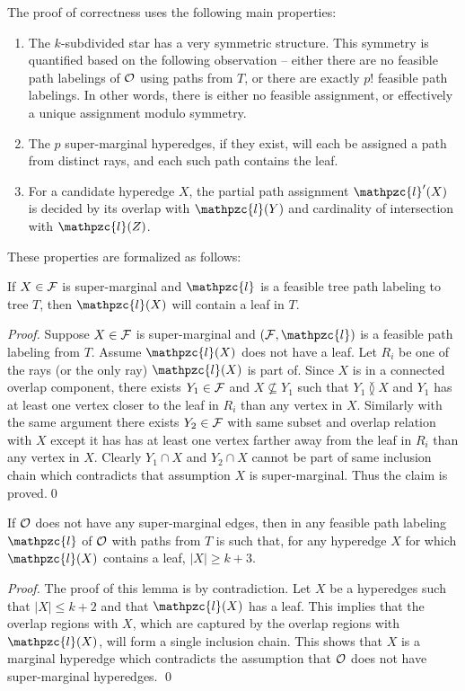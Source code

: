 \documentclass[11pt,
               envcountsect,
               envcountsame]
               {../lib/llncs2e/llncs}
\def\cF{{\cal F}}
\def\cO{{\cal O}}
\def\cl{\mathpzc{l}}
\def\overlap{\between}
\begin{document}
\noindent
The proof of correctness uses the following main properties:
\begin{enumerate}
\item The $k$-subdivided star has a very symmetric structure.  This
  symmetry is quantified based on the following observation -- either
  there are no feasible path labelings of $\cO$ using paths from $T$,
  or there are exactly $p!$ feasible path labelings.  In other words,
  there is either no feasible assignment, or effectively a unique
  assignment modulo symmetry.
\item The $p$ super-marginal hyperedges, if they exist, will each be
  assigned a path from distinct rays, and each such path contains the
  leaf.
\item For a candidate hyperedge $X$, the partial path assignment
  $\cl'(X)$ is decided by its overlap with $\cl(Y)$ and cardinality of
  intersection with $\cl(Z)$.
\end{enumerate}
These properties are formalized as follows:
\begin{lemma}
  \label{lem:sup-mar}
  If $X \in \cF$ is super-marginal and $\cl$ is a feasible tree path
  labeling to tree $T$, then $\cl(X)$ will contain a leaf in $T$.
\end{lemma}
\begin{proof}
  Suppose $X \in \cF$ is super-marginal and $(\cF, \cl)$ is a feasible
  path labeling from $T$.  Assume $\cl(X)$ does not have a leaf.  Let
  $R_i$ be one of the rays (or the only ray) $\cl(X)$ is part of.
  Since $X$ is in a connected overlap component, there exists $Y_1 \in
  \cF$ and $X \nsubseteq Y_1$ such that $Y_1 \overlap X$ and $Y_1$ has
  at least one vertex closer to the leaf in $R_i$ than any vertex in
  $X$. Similarly with the same argument there exists $Y_2 \in \cF$
  with same subset and overlap relation with $X$ except it has has at
  least one vertex farther away from the leaf in $R_i$ than any vertex
  in $X$. Clearly $Y_1 \cap X$ and $Y_2 \cap X$ cannot be part of same
  inclusion chain which contradicts that assumption $X$ is
  super-marginal. Thus the claim is proved.\qed
\end{proof}
\begin{lemma}
  If $\cO$ does not have any super-marginal edges, then in any
  feasible path labeling $\cl$ of $\cO$ with paths from $T$ is such
  that, for any hyperedge $X$ for which $\cl(X)$ contains a leaf, $|X|
  \geq k+3$.
\end{lemma}
\begin{proof}
  The proof of this lemma is by contradiction.  Let $X$ be a
  hyperedges such that $|X| \leq k+2$ and that $\cl(X)$ has a leaf.
  This implies that the overlap regions with $X$, which are captured by
  the overlap regions with $\cl(X)$, will form a single inclusion
  chain. This shows that $X$ is a marginal hyperedge which
  contradicts the assumption that $\cO$ does not have super-marginal
  hyperedges. \qed
\end{proof}
\end{document}
